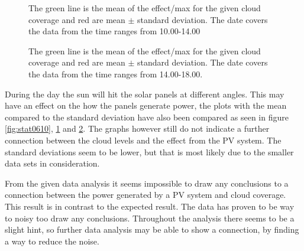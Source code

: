 \begin{figure}
  \centering
  \tiny
  
  \caption{The green line is the mean of the effect/max for the given
    cloud coverage and red are mean $\pm$ standard deviation.  The
    date covers the data from the time ranges from 10.00-14.00}
  \label{fig:stat1014}
\end{figure}

\begin{figure}
  \centering
  \tiny
  
  \caption{The green line is the mean of the effect/max for the given
    cloud coverage and red are mean $\pm$ standard deviation.  The
    date covers the data from the time ranges from 14.00-18.00.}
  \label{fig:stat1418}
\end{figure}

During the day the sun will hit the solar panels at different angles.
This may have an effect on the how the panels generate power, the
plots with the mean compared to the standard deviation have also been
compared as seen in figure \ref{fig:stat0610}, \ref{fig:stat1014} and
\ref{fig:stat1418}.  The graphs however still do not indicate a further
connection between the cloud levels and the effect from the PV system.
The standard deviations seem to be lower, but that is most likely due
to the smaller data sets in consideration.

From the given data analysis it seems impossible to draw any
conclusions to a connection between the power generated by a PV system
and cloud coverage.  This result is in contrast to the expected
result.  The data has proven to be way to noisy too draw any
conclusions.  Throughout the analysis there seems to be a slight hint,
so further data analysis may be able to show a connection, by finding
a way to reduce the noise.

